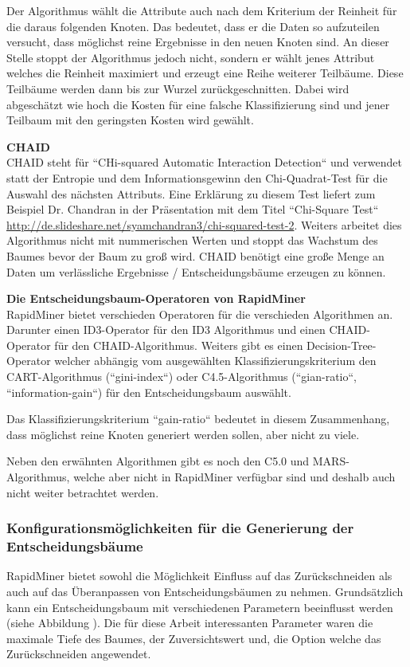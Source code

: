 Der Algorithmus wählt die Attribute auch nach dem Kriterium der Reinheit für die daraus folgenden Knoten. Das bedeutet, dass er die Daten so aufzuteilen versucht, dass möglichst reine Ergebnisse in den neuen Knoten sind. An dieser Stelle stoppt der Algorithmus jedoch nicht, sondern er wählt jenes Attribut welches die Reinheit maximiert und erzeugt  eine Reihe weiterer Teilbäume. Diese Teilbäume werden dann bis zur Wurzel zurückgeschnitten. Dabei wird abgeschätzt wie hoch die Kosten für eine falsche Klassifizierung sind und jener Teilbaum mit den geringsten Kosten wird gewählt. \cite{wei-yin_loh_classification_2008}

\textbf{CHAID} \\
CHAID steht für ``CHi-squared Automatic Interaction Detection`` und verwendet statt der Entropie und dem Informationsgewinn den Chi-Quadrat-Test für die Auswahl des nächsten Attributs. Eine Erklärung zu diesem Test liefert zum Beispiel Dr. Chandran in der Präsentation mit dem Titel ``Chi-Square Test``  \url{http://de.slideshare.net/syamchandran3/chi-squared-test-2}.
Weiters arbeitet dies Algorithmus nicht mit nummerischen Werten und stoppt das Wachstum des Baumes bevor der Baum zu groß wird. CHAID benötigt eine große Menge an Daten um verlässliche Ergebnisse / Entscheidungsbäume erzeugen zu können.\cite{rapidminer_rapidminer_2015}

\textbf{Die Entscheidungsbaum-Operatoren von RapidMiner} \\
RapidMiner bietet verschieden Operatoren für die verschieden Algorithmen an. Darunter einen ID3-Operator für den ID3 Algorithmus und einen CHAID-Operator für den CHAID-Algorithmus. Weiters gibt es einen Decision-Tree-Operator welcher abhängig vom ausgewählten Klassifizierungskriterium den CART-Algorithmus (``gini-index``)  oder C4.5-Algorithmus (``gian-ratio``, ``information-gain``) für den Entscheidungsbaum auswählt. \cite{rapidminer_rapidminer_2015} 

Das Klassifizierungskriterium ``gain-ratio`` bedeutet in diesem Zusammenhang, dass möglichst reine Knoten generiert werden sollen, aber nicht zu viele. \cite{rapidminer_rapidminer_2015} 

Neben den erwähnten Algorithmen gibt es noch den C5.0 und MARS-Algorithmus, welche aber nicht in RapidMiner verfügbar sind und deshalb auch nicht weiter betrachtet werden.

\subsubsection{Konfigurationsmöglichkeiten für die Generierung der Entscheidungsbäume}
RapidMiner bietet sowohl die Möglichkeit Einfluss auf das Zurückschneiden als auch auf das Überanpassen von Entscheidungsbäumen zu nehmen. Grundsätzlich kann ein Entscheidungsbaum mit verschiedenen Parametern beeinflusst werden (siehe Abbildung ). Die für diese Arbeit interessanten Parameter waren die maximale Tiefe des Baumes, der Zuversichtswert und, die Option welche das Zurückschneiden angewendet.

